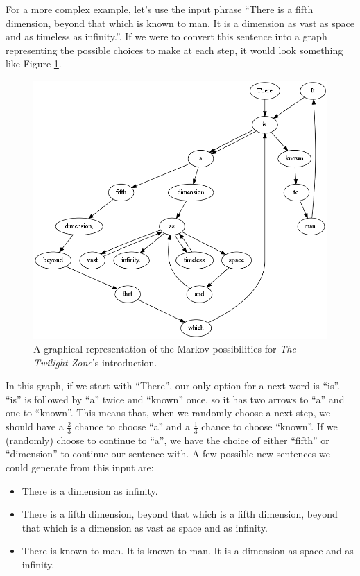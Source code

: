 \documentclass[11pt]{cselabheader}
\begin{document}
For a more complex example, let's use the input phrase ``There is a fifth
dimension, beyond that which is known to man. It is a dimension as vast as space
and as timeless as infinity.''. If we were to convert this sentence into a graph
representing the possible choices to make at each step, it would look something
like Figure \ref{twilight}.

\begin{figure}[h]
  \centering
  \includegraphics[width=\linewidth]{lab9/twilight_zone}
  \caption{A graphical representation of the Markov possibilities for \emph{The
    Twilight Zone}'s introduction.}
  \label{twilight}
\end{figure}

In this graph, if we start with ``There'', our only option for a next word is
``is''. ``is'' is followed by ``a'' twice and ``known'' once, so it has two
arrows to ``a'' and one to ``known''. This means that, when we randomly choose a
next step, we should have a $\frac{2}{3}$ chance to choose ``a'' and a
$\frac{1}{3}$ chance to choose ``known''. If we (randomly) choose to continue to
``a'', we have the choice of either ``fifth'' or ``dimension'' to continue our
sentence with. A few possible new sentences we could generate from this input
are:
\begin{itemize}
  \item There is a dimension as infinity.
  \item There is a fifth dimension, beyond that which is a fifth dimension,
    beyond that which is a dimension as vast as space and as infinity.
  \item There is known to man. It is known to man. It is a dimension as space
    and as infinity.
\end{itemize}
\end{document}
